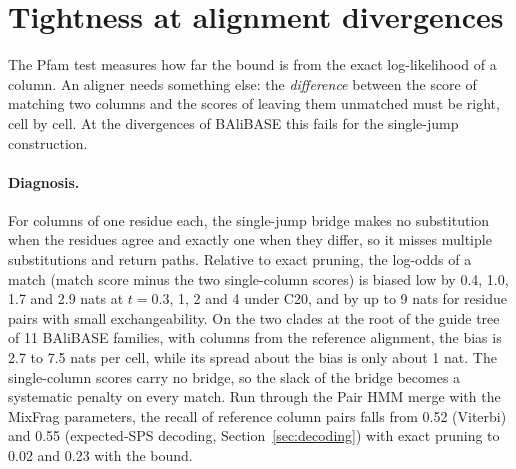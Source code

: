 \documentclass[11pt]{article}
\begin{document}
\section{Tightness at alignment divergences}
\label{sec:tightness}

The Pfam test measures how far the bound is from the exact log-likelihood of a
column. An aligner needs something else: the \emph{difference} between the
score of matching two columns and the scores of leaving them unmatched must be
right, cell by cell. At the divergences of BAliBASE this fails for the
single-jump construction.

\paragraph{Diagnosis.} For columns of one residue each, the single-jump bridge
makes no substitution when the residues agree and exactly one when they differ,
so it misses multiple substitutions and return paths. Relative to exact pruning, the
log-odds of a match (match score minus the two single-column scores) is biased
low by 0.4, 1.0, 1.7 and 2.9 nats at $t=0.3$, 1, 2 and 4 under C20, and by up to
9 nats for residue pairs with small exchangeability. On the two clades at the
root of the guide tree of 11 BAliBASE families, with columns from the
reference alignment, the bias is 2.7 to 7.5 nats per cell, while its spread
about the bias is only about 1 nat. The single-column scores carry no bridge, so the slack of
the bridge becomes a systematic penalty on every match. Run through the Pair HMM
merge with the MixFrag parameters, the recall of reference column pairs falls
from 0.52 (Viterbi) and 0.55 (expected-SPS decoding,
Section~\ref{sec:decoding}) with exact pruning to 0.02 and 0.23 with the bound.
\end{document}
